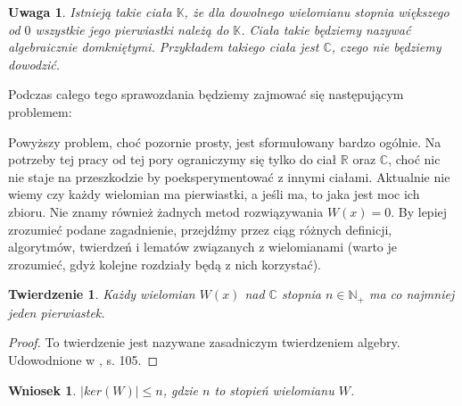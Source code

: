 \documentclass{article}
\newtheorem{thm}{Twierdzenie}
\newtheorem{remark}{Uwaga}
\newtheorem{wniosek}{Wniosek}
\begin{document}
\begin{remark}
Istnieją takie ciała $\mathbb{K}$, że dla dowolnego wielomianu stopnia większego od $0$ wszystkie jego pierwiastki należą do $\mathbb{K}$. Ciała takie będziemy nazywać algebraicznie domkniętymi. Przykładem takiego ciała jest $\mathbb{C}$, czego nie będziemy dowodzić. 
\end{remark}

Podczas całego tego sprawozdania będziemy zajmować się następującym problemem:

\begin{center}
\end{center}

Powyższy problem, choć pozornie prosty, jest sformułowany bardzo ogólnie. Na potrzeby tej pracy od tej pory ograniczymy się tylko do ciał $\mathbb{R}$ oraz $\mathbb{C}$, choć nic nie staje na przeszkodzie by poeksperymentować z innymi ciałami. Aktualnie nie wiemy czy każdy wielomian ma pierwiastki, a jeśli ma, to jaka jest moc ich zbioru. Nie znamy również żadnych metod rozwiązywania $W(x) = 0$. By lepiej zrozumieć podane zagadnienie, przejdźmy przez ciąg różnych definicji, algorytmów, twierdzeń i lematów związanych z wielomianami (warto je zrozumieć, gdyż kolejne rozdziały będą z nich korzystać).

\begin{thm}
Każdy wielomian $W(x)$ nad $\mathbb{C}$ stopnia $n \in \mathbb{N}_+$ ma co najmniej jeden pierwiastek.
\end{thm}

\begin{proof}
To twierdzenie jest nazywane zasadniczym twierdzeniem algebry. Udowodnione w \cite{leja}, s. 105.
\end{proof}

\begin{wniosek}
$| ker(W) | \leq n$, gdzie $n$ to stopień wielomianu $W$.	
\end{wniosek}
\end{document}
